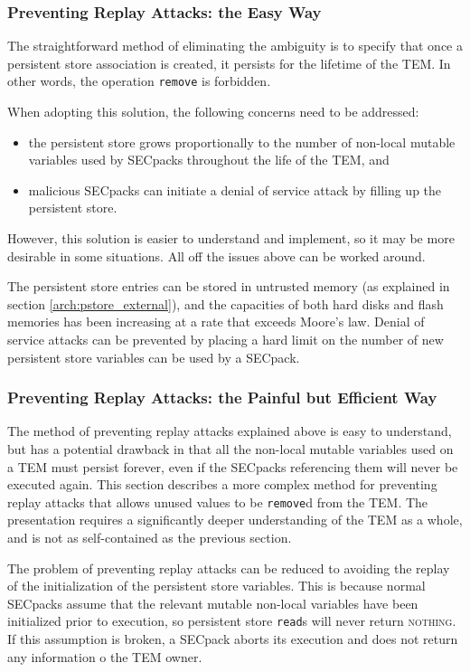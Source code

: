 \subsubsection{Preventing Replay Attacks: the Easy Way}
The straightforward method of eliminating the ambiguity is to specify
that once a persistent store association is created, it persists for the
lifetime of the TEM. In other words, the operation \texttt{remove} is forbidden.

When adopting this solution, the following concerns need to be addressed:
\begin{itemize}
  \item the persistent store grows proportionally to the number of
  non-local mutable variables used by SECpacks throughout the life of the TEM,
  and
  \item malicious SECpacks can initiate a denial of service attack by filling
  up the persistent store.
\end{itemize}

However, this solution is easier to understand and implement, so it may be more
desirable in some situations. All off the issues above can be worked around.

The persistent store entries can be stored in untrusted memory (as explained in
section \ref{arch:pstore_external}), and the capacities of both hard disks and
flash memories has been increasing at a rate that exceeds Moore's law. Denial of
service attacks can be prevented by placing a hard limit on the number of new
persistent store variables can be used by a SECpack.

\subsubsection{Preventing Replay Attacks: the Painful but Efficient Way}
The method of preventing replay attacks explained above is easy to understand,
but has a potential drawback in that all the non-local mutable variables
used on a TEM must persist forever, even if the SECpacks referencing them
will never be executed again. This section describes a more complex method for
preventing replay attacks that allows unused values to be \texttt{remove}d from
the TEM. The presentation requires a significantly deeper understanding of the
TEM as a whole, and is not as self-contained as the previous section.

The problem of preventing replay attacks can be reduced to avoiding the replay
of the initialization of the persistent store variables. This is because normal
SECpacks assume that the relevant mutable non-local variables have been
initialized prior to execution, so persistent store \texttt{read}s will never
return \textsc{nothing}. If this assumption is broken, a SECpack aborts its
execution and does not return any information  o the TEM owner. 

